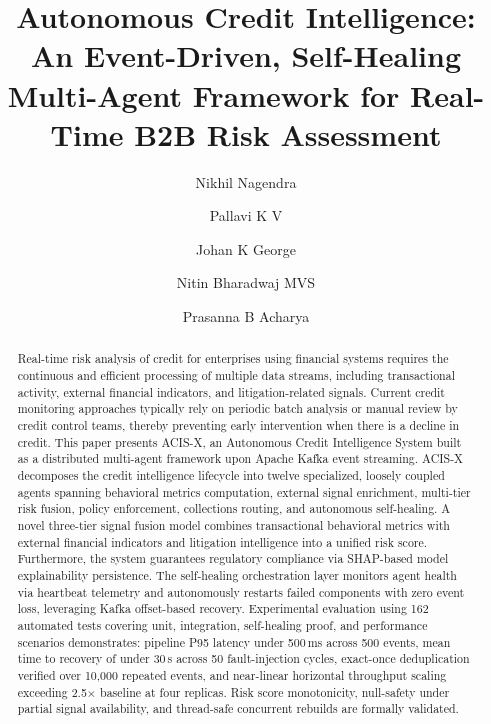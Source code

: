 ﻿\documentclass[runningheads]{llncs}
\begin{document}
\title{Autonomous Credit Intelligence: An Event-Driven, Self-Healing Multi-Agent Framework for Real-Time B2B Risk Assessment}


\author{Nikhil Nagendra \and
Pallavi K V \and
Johan K George \and
Nitin Bharadwaj MVS \and
Prasanna B Acharya}



\maketitle

\begin{abstract}
Real-time risk analysis of credit for enterprises using financial systems requires the continuous and efficient processing of multiple data streams, including transactional activity, external financial indicators, and litigation-related signals. Current credit monitoring approaches typically rely on periodic batch analysis or manual review by credit control teams, thereby preventing early intervention when there is a decline in credit. This paper presents ACIS-X, an Autonomous Credit Intelligence System built as a distributed multi-agent framework upon Apache Kafka event streaming. ACIS-X decomposes the credit intelligence lifecycle into twelve specialized, loosely coupled agents spanning behavioral metrics computation, external signal enrichment, multi-tier risk fusion, policy enforcement, collections routing, and autonomous self-healing. A novel three-tier signal fusion model combines transactional behavioral metrics with external financial indicators and litigation intelligence into a unified risk score. Furthermore, the system guarantees regulatory compliance via SHAP-based model explainability persistence. The self-healing orchestration layer monitors agent health via heartbeat telemetry and autonomously restarts failed components with zero event loss, leveraging Kafka offset-based recovery. Experimental evaluation using 162 automated tests covering unit, integration, self-healing proof, and performance scenarios demonstrates: pipeline P95 latency under 500\,ms across 500 events, mean time to recovery of under 30\,s across 50 fault-injection cycles, exact-once deduplication verified over 10,000 repeated events, and near-linear horizontal throughput scaling exceeding 2.5$\times$ baseline at four replicas. Risk score monotonicity, null-safety under partial signal availability, and thread-safe concurrent rebuilds are formally validated.
\end{abstract}
\end{document}
